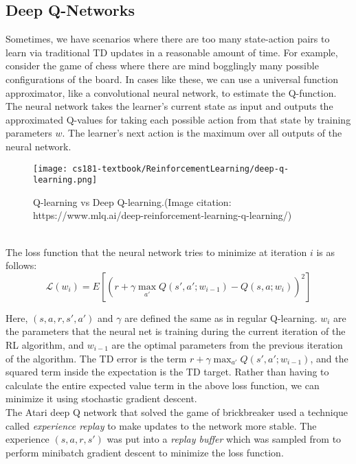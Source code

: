 \subsection{Deep Q-Networks}
Sometimes, we have scenarios where there are too many state-action pairs to learn via traditional TD updates in a reasonable amount of time. For example, consider the game of chess where there are mind bogglingly many possible configurations of the board. In cases like these, we can use a universal function approximator, like a convolutional neural network, to estimate the Q-function. The neural network takes the learner's current state as input and outputs the approximated Q-values for taking each possible action from that state by training parameters $w$. The learner's next action is the maximum over all outputs of the neural network.
\begin{figure}[ht!]
    \centering
    \texttt{[image: cs181-textbook/ReinforcementLearning/deep-q-learning.png]}
    \caption{Q-learning vs Deep Q-learning.(Image citation: https://www.mlq.ai/deep-reinforcement-learning-q-learning/)}
    \label{fig:my_label}
\end{figure}\\
The loss function that the neural network tries to minimize at iteration $i$ is as follows:
\begin{equation}
    \mathcal{L}(w_i) = E[(r + \gamma\max_{a'}Q(s', a'; w_{i-1}) - Q(s, a; w_i))^2]
\end{equation}

Here, $(s, a, r, s', a')$ and $\gamma$ are defined the same as in regular Q-learning. $w_i$ are the parameters that the neural net is training during the current iteration of the RL algorithm, and $w_{i-1}$ are the optimal parameters from the previous iteration of the algorithm. The TD error is the term $r + \gamma\max_{a'}Q(s', a';w_{i-1})$, and the squared term inside the expectation is the TD target. Rather than having to calculate the entire expected value term in the above loss function, we can minimize it using stochastic gradient descent.\\

The Atari deep Q network that solved the game of brickbreaker used a technique called \textit{experience replay} to make updates to the network more stable. The experience $(s, a, r, s')$ was put into a \textit{replay buffer} which was sampled from to perform minibatch gradient descent to minimize the loss function.
